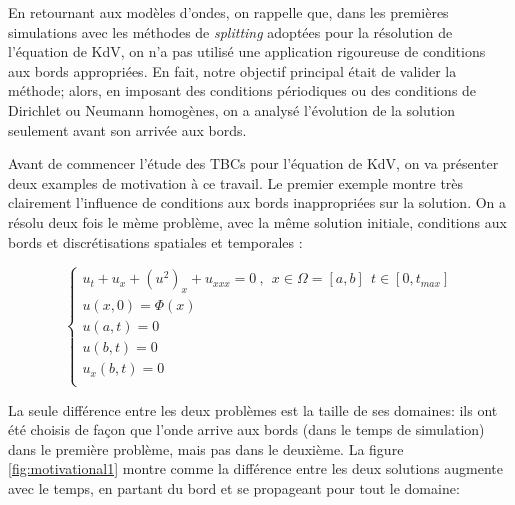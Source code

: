 \indent En retournant aux modèles d'ondes, on rappelle que, dans les premières simulations avec les méthodes de \emph{splitting} adoptées pour la résolution de l'équation de KdV, on n'a pas utilisé une application rigoureuse  de conditions aux bords appropriées. En fait, notre objectif principal était de valider la méthode; alors, en imposant des conditions périodiques ou des conditions de Dirichlet ou Neumann homogènes, on a analysé l'évolution de la solution seulement avant son arrivée aux bords.

\indent Avant de commencer l'étude des TBCs pour l'équation de KdV, on va présenter deux examples de motivation à ce travail. Le premier exemple montre très clairement l'influence de conditions aux bords inappropriées sur la solution. On a résolu deux fois le mème problème, avec la même solution initiale, conditions aux bords et discrétisations spatiales et temporales :

\begin{equation*}
    \begin{cases}
    u_t + u_x + (u^2)_x + u_{xxx} = 0 \ , \ \ x \in \Omega=[a,b] \ \ t \in [0, t_{max}] \\
    u(x,0) = \Phi(x) \\
    u(a,t) = 0 \\
    u(b,t) = 0 \\
    u_x(b,t) = 0  \\ 
    \end{cases}
\end{equation*}

\indent La seule différence entre les deux problèmes est la taille de ses domaines: ils ont été choisis de façon que l'onde arrive aux bords (dans le temps de simulation) dans le première problème, mais pas dans le deuxième. La figure \ref{fig:motivational1} montre comme la différence entre les deux solutions augmente avec le temps, en partant du bord et se propageant pour tout le domaine:

